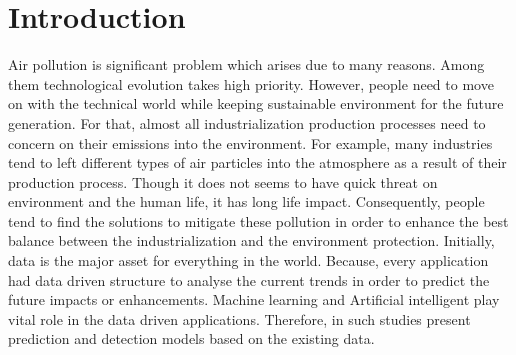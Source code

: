 \section{Introduction}\label{sec-intro}








{}
Air pollution is significant problem which arises due to many reasons.
Among them technological evolution takes high priority.
However, people need to move on with the technical world 
while keeping sustainable environment for the future generation.
For that, almost all industrialization production processes need 
to concern on their emissions into the environment.
For example, many industries tend to left different types of air 
particles into the atmosphere as a result of their production process.
Though it does not seems to have quick threat on environment and the human life,
it has long life impact. Consequently, people tend to find the solutions to 
mitigate these pollution in order to enhance the best balance between 
the industrialization and the environment protection. 
Initially, data is the major asset for everything in the world.
Because, every application had data driven structure to analyse the current trends 
in order to predict the future impacts or enhancements.
Machine learning and Artificial intelligent play vital role in the data driven applications. 
Therefore, in such studies present prediction and detection models based on the existing data.


